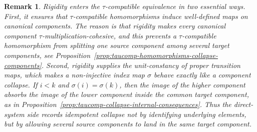 \documentclass[pdflatex,sn-mathphys-num]{sn-jnl}
\theoremstyle{thmstyleone}%
\theoremstyle{thmstyletwo}%
\newtheorem{remark}[theorem]{Remark}
\theoremstyle{thmstylethree}%
\begin{document}
\begin{remark}\label{rem:role-of-rigidity-taucomp-equivalence}
Rigidity enters the \(\tau\)-compatible equivalence in two essential ways.
First, it ensures that \(\tau\)-compatible homomorphisms induce well-defined maps on canonical components.
The reason is that rigidity makes every canonical component \(\tau\)-multiplication-cohesive, and this prevents a \(\tau\)-compatible homomorphism from splitting one source component among several target components, see Proposition~\ref{prop:taucomp-homomorphisms-collapse-components}.
Second, rigidity supplies the unit-constancy of proper transition maps, which makes a non-injective index map \(\sigma\) behave exactly like a component collapse.
If \(i<k\) and \(\sigma(i)=\sigma(k)\), then the image of the higher component absorbs the image of the lower component inside the common target component, as in Proposition~\ref{prop:taucomp-collapse-internal-consequences}.
Thus the direct-system side records idempotent collapse not by identifying underlying elements, but by allowing several source components to land in the same target component.
\end{remark}
\end{document}
